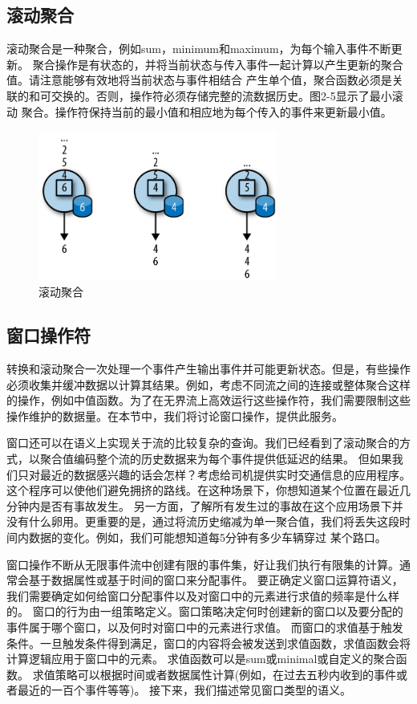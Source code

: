 \documentclass[cn,11pt,chinese]{elegantbook}
\begin{document}
\subsection{滚动聚合}

滚动聚合是一种聚合，例如sum，minimum和maximum，为每个输入事件不断更新。 聚合操作是有状态的，并将当前状态与传入事件一起计算以产生更新的聚合值。请注意能够有效地将当前状态与事件相结合 产生单个值，聚合函数必须是关联的和可交换的。否则，操作符必须存储完整的流数据历史。图2-5显示了最小滚动 聚合。操作符保持当前的最小值和相应地为每个传入的事件来更新最小值。

\begin{figure}[htbp]
  \centering
  \includegraphics[width=0.7\textwidth]{images/spaf_0205.png}
  \caption{滚动聚合}
\end{figure}

\subsection{窗口操作符}

转换和滚动聚合一次处理一个事件产生输出事件并可能更新状态。但是，有些操作必须收集并缓冲数据以计算其结果。例如，考虑不同流之间的连接或整体聚合这样的操作，例如中值函数。为了在无界流上高效运行这些操作符，我们需要限制这些操作维护的数据量。在本节中，我们将讨论窗口操作，提供此服务。

窗口还可以在语义上实现关于流的比较复杂的查询。我们已经看到了滚动聚合的方式，以聚合值编码整个流的历史数据来为每个事件提供低延迟的结果。 但如果我们只对最近的数据感兴趣的话会怎样？考虑给司机提供实时交通信息的应用程序。这个程序可以使他们避免拥挤的路线。在这种场景下，你想知道某个位置在最近几分钟内是否有事故发生。 另一方面，了解所有发生过的事故在这个应用场景下并没有什么卵用。更重要的是，通过将流历史缩减为单一聚合值，我们将丢失这段时间内数据的变化。例如，我们可能想知道每5分钟有多少车辆穿过 某个路口。

窗口操作不断从无限事件流中创建有限的事件集，好让我们执行有限集的计算。通常会基于数据属性或基于时间的窗口来分配事件。 要正确定义窗口运算符语义，我们需要确定如何给窗口分配事件以及对窗口中的元素进行求值的频率是什么样的。 窗口的行为由一组策略定义。窗口策略决定何时创建新的窗口以及要分配的事件属于哪个窗口，以及何时对窗口中的元素进行求值。 而窗口的求值基于触发条件。一旦触发条件得到满足，窗口的内容将会被发送到求值函数，求值函数会将计算逻辑应用于窗口中的元素。 求值函数可以是sum或minimal或自定义的聚合函数。 求值策略可以根据时间或者数据属性计算(例如，在过去五秒内收到的事件或者最近的一百个事件等等)。 接下来，我们描述常见窗口类型的语义。
\end{document}
